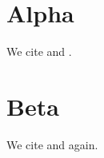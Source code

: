 \documentclass{article}
\begin{document}
\section{Alpha}
We cite \cite{a1} and \cite{a2}.
\section{Beta}
We cite \cite{b1} and \cite{a2} again.
\end{document}
